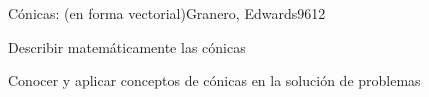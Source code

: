 \begin{syllabus}
\begin{unit}{Cónicas: (en forma vectorial)}{Granero, Edwards96}{12}
   \begin{learningoutcomes}
      \item Describir matemáticamente las cónicas
      \item Conocer y aplicar conceptos de cónicas en la solución de problemas
   \end{learningoutcomes}
\end{unit}

\begin{coursebibliography}
\end{coursebibliography}
\end{syllabus}
